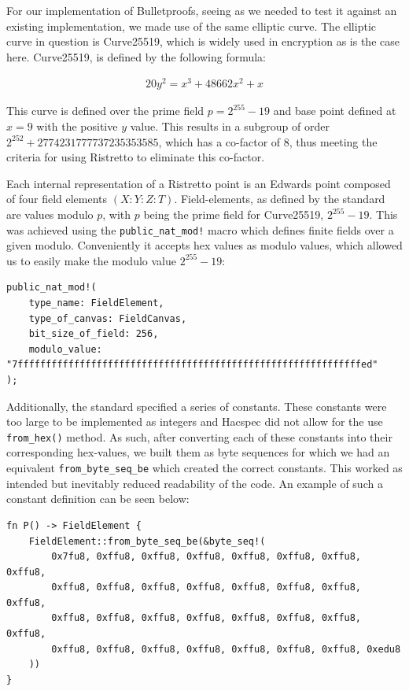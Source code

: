 \documentclass{article}
\newcommand{\eq}[1]{\begin{alignat*}{20}#1\end{alignat*}}
\begin{document}
For our implementation of Bulletproofs, seeing as we needed to test it
against an existing implementation, we made use of the same elliptic
curve. The elliptic curve in question is Curve25519, which is widely
used in encryption as is the case here. Curve25519, is defined by the
following formula:

\eq{
	y^2 = x^3 + 48662x^2 + x
}

This curve is defined over the prime field $p = 2^{255} - 19$ and base
point defined at $x = 9$ with the positive $y$ value. This results
in a subgroup of order $2^{252} + 2774231777737235353585$, which has
a co-factor of $8$, thus meeting the criteria for using Ristretto to
eliminate this co-factor.

Each internal representation of a Ristretto point is an Edwards point
composed of four field elements $(X : Y : Z : T)$. Field-elements,
as defined by the standard are values modulo $p$, with $p$ being the
prime field for Curve25519, $2^{255} - 19$. This was achieved using
the \texttt{public\_nat\_mod!} macro which defines finite fields over
a given modulo. Conveniently it accepts hex values as modulo values,
which allowed us to easily make the modulo value $2^{255} - 19$:

\begin{lstlisting}
public_nat_mod!(
	type_name: FieldElement,
	type_of_canvas: FieldCanvas,
	bit_size_of_field: 256,
	modulo_value: "7fffffffffffffffffffffffffffffffffffffffffffffffffffffffffffffed"
);
\end{lstlisting}

Additionally, the standard specified a series of constants. These
constants were too large to be implemented as integers and Hacspec
did not allow for the use \texttt{from\_hex()} method. As such, after
converting each of these constants into their corresponding hex-values,
we built them as byte sequences for which we had an equivalent
\texttt{from\_byte\_seq\_be} which created the correct constants. This
worked as intended but inevitably reduced readability of the code. An
example of such a constant definition can be seen below:

\begin{lstlisting}
fn P() -> FieldElement {
	FieldElement::from_byte_seq_be(&byte_seq!(
		0x7fu8, 0xffu8, 0xffu8, 0xffu8, 0xffu8, 0xffu8, 0xffu8, 0xffu8,
		0xffu8, 0xffu8, 0xffu8, 0xffu8, 0xffu8, 0xffu8, 0xffu8, 0xffu8,
		0xffu8, 0xffu8, 0xffu8, 0xffu8, 0xffu8, 0xffu8, 0xffu8, 0xffu8,
		0xffu8, 0xffu8, 0xffu8, 0xffu8, 0xffu8, 0xffu8, 0xffu8, 0xedu8
	))
}
\end{lstlisting}
\end{document}
